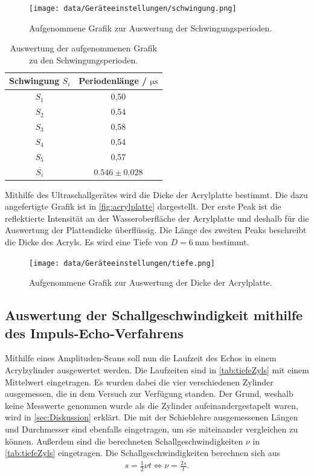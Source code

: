 \begin{figure}[H]
  \centering
  \texttt{[image: data/Geräteeinstellungen/schwingung.png]}
  \caption{Aufgenommene Grafik zur Auswertung der Schwingungsperioden.}
  \label{fig:schwingungen}
\end{figure}

\begin{table}
  \centering
  \caption{Auswertung der aufgenommenen Grafik zu den Schwingungsperioden.}
  \label{tab:perids}
  \begin{tabular}{c c}
    \toprule
    Schwingung $S_i$ & Periodenlänge / $\si{\micro\second}$  \\
    \midrule
    $S_1$ & 0,50 \\
    $S_2$ & 0,54 \\
    $S_3$ & 0,58 \\
    $S_4$ & 0,54 \\
    $S_5$ & 0,57 \\
    $\overline{S_i}$ & $0.546 \pm 0.028$ \\
    \bottomrule
  \end{tabular}
\end{table}

Mithilfe des Ultraschallgerätes wird die Dicke der Acrylplatte bestimmt. Die dazu angefertigte Grafik ist in \autoref{fig:acrylplatte} dargestellt.
Der erste Peak ist die reflektierte Intensität an der Wasseroberfläche der Acrylplatte und deshalb für die Auswertung der Plattendicke überflüssig. Die Länge des zweiten Peaks beschreibt die Dicke des Acryls.
Es wird eine Tiefe von $D = \SI{6}{\milli\meter}$ bestimmt.

\begin{figure}[H]
  \centering
  \texttt{[image: data/Geräteeinstellungen/tiefe.png]}
  \caption{Aufgenommene Grafik zur Auswertung der Dicke der Acrylplatte.}
  \label{fig:acrylplatte}
\end{figure}

\subsection{Auswertung der Schallgeschwindigkeit mithilfe des Impuls-Echo-Verfahrens}
\label{subsec:schallImpEcho}

Mithilfe eines Amplituden-Scans soll nun die Laufzeit des Echos in einem Acrylzylinder ausgewertet werden. Die Laufzeiten sind in \autoref{tab:tiefeZyls} mit einem Mittelwert eingetragen.
Es wurden dabei die vier verschiedenen Zylinder ausgemessen, die in dem Versuch zur Verfügung standen. Der Grund, weshalb keine Messwerte genommen wurde als die Zylinder aufeinandergestapelt waren, 
wird in \autoref{sec:Diskussion} erklärt. %
Die mit der Schieblehre ausgemessenen Längen und Durchmesser sind ebenfalls eingetragen, um sie miteinander vergleichen zu können.
Außerdem sind die berechneten Schallgeschwindigkeiten $\nu$ in \autoref{tab:tiefeZyls} eingetragen.
Die Schallgeschwindigkeiten berechnen sich aus
\begin{align}
  s = \frac 12 \nu t \iff \nu = \frac{2s}{t}.
\end{align}

